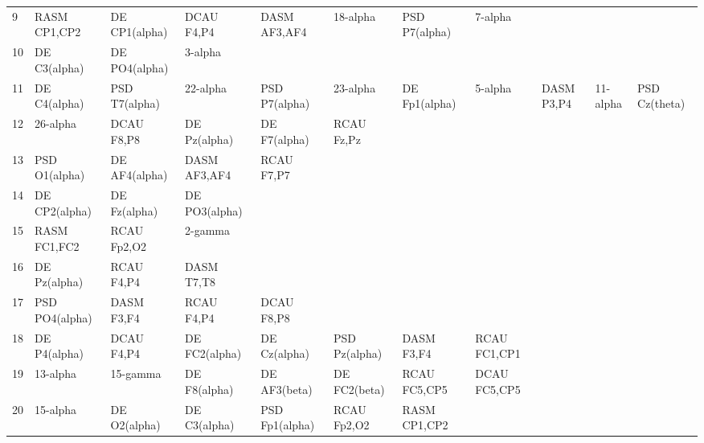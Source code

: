 \begin{landscape}
\begin{table}[]
\begin{tabular}{l|llllllll}
9        & RASM CP1,CP2   & DE CP1(alpha)  & DCAU F4,P4     & DASM AF3,AF4   & 18-alpha       & PSD P7(alpha)  & 7-alpha       &                &               &               \\
10       & DE C3(alpha)   & DE PO4(alpha)  & 3-alpha        &                &                &                &               &                &               &               \\
11       & DE C4(alpha)   & PSD T7(alpha)  & 22-alpha       & PSD P7(alpha)  & 23-alpha       & DE Fp1(alpha)  & 5-alpha       & DASM P3,P4     & 11-alpha      & PSD Cz(theta) \\
12       & 26-alpha       & DCAU F8,P8     & DE Pz(alpha)   & DE F7(alpha)   & RCAU Fz,Pz     &                &               &                &               &               \\
13       & PSD O1(alpha)  & DE AF4(alpha)  & DASM AF3,AF4   & RCAU F7,P7     &                &                &               &                &               &               \\
14       & DE CP2(alpha)  & DE Fz(alpha)   & DE PO3(alpha)  &                &                &                &               &                &               &               \\
15       & RASM FC1,FC2   & RCAU Fp2,O2    & 2-gamma        &                &                &                &               &                &               &               \\
16       & DE Pz(alpha)   & RCAU F4,P4     & DASM T7,T8     &                &                &                &               &                &               &               \\
17       & PSD PO4(alpha) & DASM F3,F4     & RCAU F4,P4     & DCAU F8,P8     &                &                &               &                &               &               \\
18       & DE P4(alpha)   & DCAU F4,P4     & DE FC2(alpha)  & DE Cz(alpha)   & PSD Pz(alpha)  & DASM F3,F4     & RCAU FC1,CP1  &                &               &               \\
19       & 13-alpha       & 15-gamma       & DE F8(alpha)   & DE AF3(beta)   & DE FC2(beta)   & RCAU FC5,CP5   & DCAU FC5,CP5  &                &               &               \\
20       & 15-alpha       & DE O2(alpha)   & DE C3(alpha)   & PSD Fp1(alpha) & RCAU Fp2,O2    & RASM CP1,CP2   &               &                &               &               \\

\end{tabular}
\end{table}
\end{landscape}
